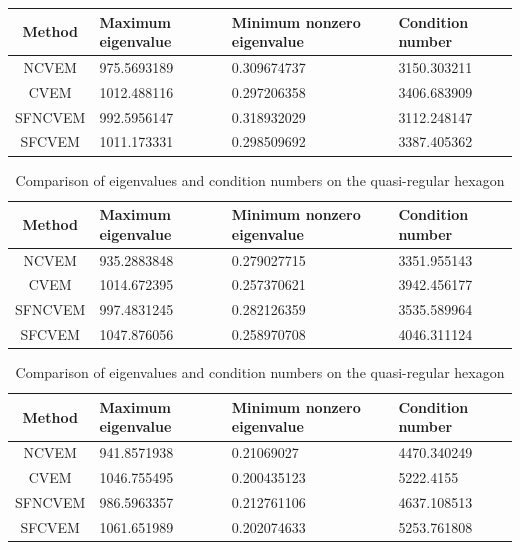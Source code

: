 \documentclass[10pt]{amsart}
\theoremstyle{definition}
\theoremstyle{remark}
\begin{document}
\begin{enumerate}[1.]
\begin{table}[htbp]
\label{tab:comparison0}
\begin{tabular}{c|p{3cm}<{\centering}p{3.5cm}<{\centering}p{3cm}<{\centering}}
\hline
\textbf{Method} & \textbf{Maximum eigenvalue} & \textbf{Minimum nonzero
eigenvalue} & \textbf{Condition number} \\ \hline
NCVEM & 975.5693189 & 0.309674737 & 3150.303211 \\ \hline
CVEM & 1012.488116 & 0.297206358 & 3406.683909 \\ \hline
SFNCVEM & 992.5956147 & 0.318932029 & 3112.248147 \\ \hline
SFCVEM & 1011.173331 & 0.298509692 & 3387.405362 \\
\hline
\end{tabular}
\end{table}
\begin{table}[htbp]
\centering
\caption{Comparison of eigenvalues and condition numbers on the quasi-regular hexagon}
\label{tab:comparison1}
\begin{tabular}{c|p{3cm}<{\centering}p{3.5cm}<{\centering}p{3cm}<{\centering}}
\hline
\textbf{Method} & \textbf{Maximum eigenvalue} & \textbf{Minimum nonzero
eigenvalue} & \textbf{Condition number} \\ \hline
NCVEM   & 935.2883848 & 0.279027715 & 3351.955143 \\ \hline
CVEM    & 1014.672395 & 0.257370621 & 3942.456177 \\ \hline
SFNCVEM & 997.4831245 & 0.282126359 & 3535.589964 \\ \hline
SFCVEM  & 1047.876056 & 0.258970708 &
4046.311124 \\
\hline
\end{tabular}
\end{table}
\begin{table}[htbp]
\centering
\caption{Comparison of eigenvalues and condition numbers on the quasi-regular hexagon}
\label{tab:comparison2}
\begin{tabular}{c|p{3cm}<{\centering}p{3.5cm}<{\centering}p{3cm}<{\centering}}
\hline
\textbf{Method} & \textbf{Maximum eigenvalue} & \textbf{Minimum nonzero
eigenvalue} & \textbf{Condition number} \\ \hline
 NCVEM   & 941.8571938&	0.21069027	&4470.340249 \\ \hline
 CVEM    & 1046.755495&	0.200435123	&5222.4155 \\ \hline
 SFNCVEM & 986.5963357&	0.212761106	&4637.108513 \\ \hline
 SFCVEM  & 1061.651989&	0.202074633	&5253.761808 \\
\hline
\end{tabular}
\end{table}


\end{enumerate}
\end{document}
